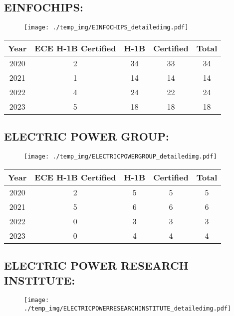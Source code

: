 \documentclass{article}%
\begin{document}
%
\newpage%
\subsection{EINFOCHIPS:}%
\label{subsec:EINFOCHIPS}%
\label{EINFOCHIPSdetailed}%


\begin{figure}[htbp]%
\centering%
\texttt{[image: ./temp\_img/EINFOCHIPS\_detailedimg.pdf]}%
\end{figure}

%
\begin{longtable}{c|c|c|c|c}%
\hline%
Year&ECE H{-}1B Certified&H{-}1B&Certified&Total\\%
\hline%
2020&2&34&33&34\\%
\hline%
2021&1&14&14&14\\%
\hline%
2022&4&24&22&24\\%
\hline%
2023&5&18&18&18\\%
\hline%
\end{longtable}

%
\newpage%
\subsection{ELECTRIC POWER GROUP:}%
\label{subsec:ELECTRICPOWERGROUP}%
\label{ELECTRICPOWERGROUPdetailed}%


\begin{figure}[htbp]%
\centering%
\texttt{[image: ./temp\_img/ELECTRICPOWERGROUP\_detailedimg.pdf]}%
\end{figure}

%
\begin{longtable}{c|c|c|c|c}%
\hline%
Year&ECE H{-}1B Certified&H{-}1B&Certified&Total\\%
\hline%
2020&2&5&5&5\\%
\hline%
2021&5&6&6&6\\%
\hline%
2022&0&3&3&3\\%
\hline%
2023&0&4&4&4\\%
\hline%
\end{longtable}

%
\newpage%
\subsection{ELECTRIC POWER RESEARCH INSTITUTE:}%
\label{subsec:ELECTRICPOWERRESEARCHINSTITUTE}%
\label{ELECTRICPOWERRESEARCHINSTITUTEdetailed}%


\begin{figure}[htbp]%
\centering%
\texttt{[image: ./temp\_img/ELECTRICPOWERRESEARCHINSTITUTE\_detailedimg.pdf]}%
\end{figure}
\end{document}
